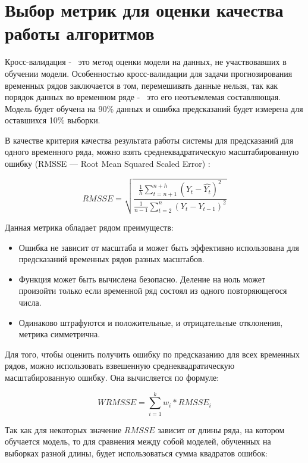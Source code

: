 \section{Выбор метрик для оценки качества работы алгоритмов}

Кросс-валидация -~ это метод оценки модели на данных, не участвовавших
в обучении модели. Особенностью кросс-валидации для задачи прогнозирования
временных рядов заключается в том, перемешивать данные нельзя,
так как порядок данных во временном ряде -~ это его неотъемлемая составляющая.
Модель будет обучена на 90\% данных и ошибка предсказаний будет измерена
для оставшихся 10\% выборки.

В качестве критерия качества результата работы системы для предсказаний
для одного временного ряда, можно взять среднеквадратическую
масштабированную ошибку (RMSSE --- Root Mean Squared Scaled Error) \cite{hyndman2006another}:

\begin{equation}\label{eq:rmsse}
	RMSSE = \sqrt{ \frac{ \frac{1}{h} \sum_{t=n+1}^{n+h}(Y_t - \hat{Y_t})^2  }{ \frac{1}{n-1} \sum_{t=2}^{n} (Y_t - Y_{t-1})^2 } }
\end{equation}

Данная метрика обладает рядом преимуществ:

\begin{itemize}
	\item Ошибка не зависит от масштаба и может быть эффективно использована для предсказаний временных рядов разных масштабов.
	\item Функция может быть вычислена безопасно. Деление на ноль может произойти только если временной ряд состоял из одного повторяющегося числа.
	\item Одинаково штрафуются и положительные, и отрицательные отклонения, метрика симметрична.
\end{itemize}

Для того, чтобы оценить получить ошибку по предсказанию для всех временных рядов,
можно использовать взвешенную среднеквадратическую масштабированную ошибку.
Она вычисляется по формуле:

\begin{equation}\label{eq:wrmsse}
	WRMSSE = \sum_{i=1}^{k} w_i * RMSSE_i
\end{equation}

Так как для некоторых значение $ RMSSE $ зависит от длины ряда, на котором обучается
модель, то для сравнения между собой моделей, обученных на выборках разной длины,
будет использоваться сумма квадратов ошибок:

